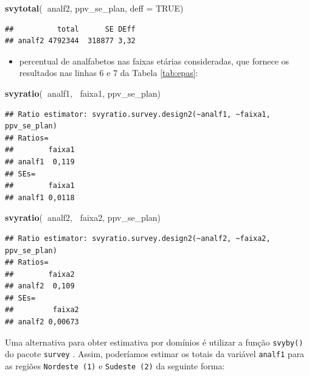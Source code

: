 \documentclass[]{book}
\newenvironment{Shaded}{\begin{snugshade}}{\end{snugshade}}
\newcommand{\KeywordTok}[1]{\textcolor[rgb]{0.13,0.29,0.53}{\textbf{#1}}}
\newcommand{\DataTypeTok}[1]{\textcolor[rgb]{0.13,0.29,0.53}{#1}}
\newcommand{\OtherTok}[1]{\textcolor[rgb]{0.56,0.35,0.01}{#1}}
\newcommand{\OperatorTok}[1]{\textcolor[rgb]{0.81,0.36,0.00}{\textbf{#1}}}
\newcommand{\NormalTok}[1]{#1}
\providecommand{\tightlist}{%
  \setlength{\itemsep}{0pt}\setlength{\parskip}{0pt}}
\theoremstyle{definition}
\theoremstyle{definition}
\theoremstyle{definition}
\theoremstyle{remark}
\begin{document}
\begin{Shaded}
\begin{Highlighting}[]
\KeywordTok{svytotal}\NormalTok{(}\OperatorTok{~}\NormalTok{analf2, ppv_se_plan, }\DataTypeTok{deff =} \OtherTok{TRUE}\NormalTok{)}
\end{Highlighting}
\end{Shaded}

\begin{verbatim}
##          total      SE DEff
## analf2 4792344  318877 3,32
\end{verbatim}

\begin{itemize}
\tightlist
\item
  percentual de analfabetos nas faixas etárias consideradas, que fornece
  os resultados nas linhas 6 e 7 da Tabela \ref{tab:epas}:
\end{itemize}

\begin{Shaded}
\begin{Highlighting}[]
\KeywordTok{svyratio}\NormalTok{(}\OperatorTok{~}\NormalTok{analf1, }\OperatorTok{~}\NormalTok{faixa1, ppv_se_plan)}
\end{Highlighting}
\end{Shaded}

\begin{verbatim}
## Ratio estimator: svyratio.survey.design2(~analf1, ~faixa1, ppv_se_plan)
## Ratios=
##        faixa1
## analf1  0,119
## SEs=
##        faixa1
## analf1 0,0118
\end{verbatim}

\begin{Shaded}
\begin{Highlighting}[]
\KeywordTok{svyratio}\NormalTok{(}\OperatorTok{~}\NormalTok{analf2, }\OperatorTok{~}\NormalTok{faixa2, ppv_se_plan)}
\end{Highlighting}
\end{Shaded}

\begin{verbatim}
## Ratio estimator: svyratio.survey.design2(~analf2, ~faixa2, ppv_se_plan)
## Ratios=
##        faixa2
## analf2  0,109
## SEs=
##         faixa2
## analf2 0,00673
\end{verbatim}

Uma alternativa para obter estimativa por domínios é utilizar a função
\texttt{svyby()} do pacote \texttt{survey} \citep{R-survey}. Assim,
poderíamos estimar os totais da variável \texttt{analf1} para as regiões
\texttt{Nordeste\ (1)} e \texttt{Sudeste\ (2)} da seguinte forma:
\end{document}
